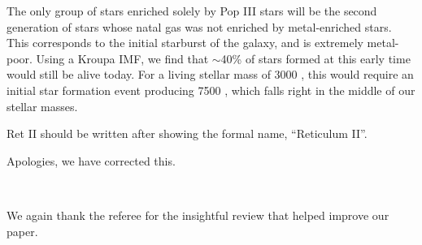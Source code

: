 \documentclass[11pt]{article}
\begin{document}
The only group of stars enriched solely by Pop III stars will be the second generation of stars whose natal gas was not enriched by metal-enriched stars. This corresponds to the initial starburst of the galaxy, and is extremely metal-poor. Using a Kroupa IMF, we find that $\sim$40\% of stars formed at this early time would still be alive today. For a living stellar mass of 3000 \Ms, this would require an initial star formation event producing 7500 \Ms, which falls right in the middle of our stellar masses.

\begin{tcolorbox}[colback={lightgray}] 
Ret II should be written after showing the formal name, “Reticulum II”.
\end{tcolorbox} 

Apologies, we have corrected this. 

\

We again thank the referee for the insightful review that helped improve our paper.



\end{document}

